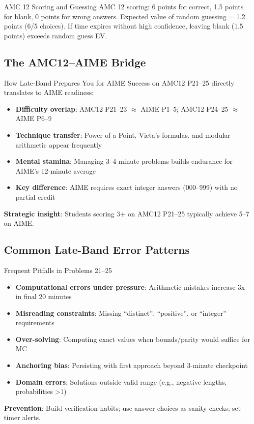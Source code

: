 \documentclass{article}
\begin{document}
\begin{warningbox}{AMC 12 Scoring and Guessing}
AMC 12 scoring: 6 points for correct, 1.5 points for blank, 0 points for wrong answers. Expected value of random guessing = 1.2 points (6/5 choices). If time expires without high confidence, leaving blank (1.5 points) exceeds random guess EV.
\end{warningbox}

\subsection{The AMC12--AIME Bridge}
\begin{contextbox}{How Late-Band Prepares You for AIME}
Success on AMC12 P21--25 directly translates to AIME readiness:
\begin{itemize}[nosep]
\item \textbf{Difficulty overlap}: AMC12 P21--23 $\approx$ AIME P1--5; AMC12 P24--25 $\approx$ AIME P6--9
\item \textbf{Technique transfer}: Power of a Point, Vieta's formulas, and modular arithmetic appear frequently
\item \textbf{Mental stamina}: Managing 3--4 minute problems builds endurance for AIME's 12-minute average
\item \textbf{Key difference}: AIME requires exact integer answers (000--999) with no partial credit
\end{itemize}
\textbf{Strategic insight}: Students scoring 3+ on AMC12 P21--25 typically achieve 5--7 on AIME.
\end{contextbox}

\subsection{Common Late-Band Error Patterns}
\begin{warningbox}{Frequent Pitfalls in Problems 21--25}
\begin{itemize}[nosep]
\item \textbf{Computational errors under pressure}: Arithmetic mistakes increase 3x in final 20 minutes
\item \textbf{Misreading constraints}: Missing ``distinct'', ``positive'', or ``integer'' requirements
\item \textbf{Over-solving}: Computing exact values when bounds/parity would suffice for MC
\item \textbf{Anchoring bias}: Persisting with first approach beyond 3-minute checkpoint
\item \textbf{Domain errors}: Solutions outside valid range (e.g., negative lengths, probabilities >1)
\end{itemize}
\textbf{Prevention}: Build verification habits; use answer choices as sanity checks; set timer alerts.
\end{warningbox}
\end{document}

